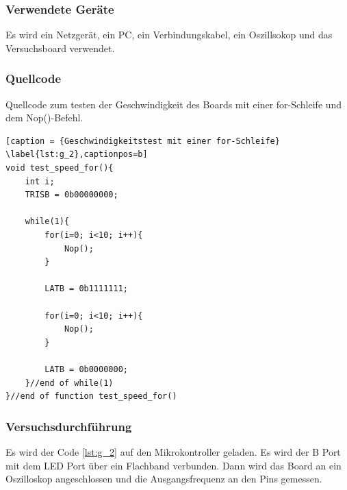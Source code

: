 \documentclass[12pt,a4paper]{article}
\begin{document}
\subsubsection*{Verwendete Geräte}

Es wird ein Netzgerät, ein PC, ein Verbindungskabel, ein Oszillsokop und das Versuchsboard verwendet.


\subsubsection*{Quellcode}

Quellcode zum testen der Geschwindigkeit des Boards mit einer for-Schleife und dem Nop()-Befehl.

\lstset{language=C, basicstyle=\tiny}
\begin{lstlisting}[caption = {Geschwindigkeitstest mit einer for-Schleife} \label{lst:g_2},captionpos=b]
void test_speed_for(){
	int i;
	TRISB = 0b00000000;
	
	while(1){
		for(i=0; i<10; i++){
			Nop();
		}
	
		LATB = 0b1111111;
		
		for(i=0; i<10; i++){
			Nop();
		}
		
		LATB = 0b0000000;
	}//end of while(1)
}//end of function test_speed_for()
\end{lstlisting}


\subsubsection*{Versuchsdurchführung}

Es wird der Code \ref{lst:g_2} auf den Mikrokontroller geladen. Es wird der B Port mit dem LED Port über ein Flachband verbunden. Dann wird das Board an ein Oszilloskop angeschlossen und die Ausgangsfrequenz an den Pins gemessen.
\end{document}
